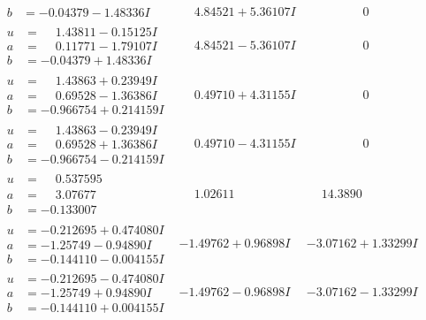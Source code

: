 \documentclass[1p]{elsarticle_modified}
\theoremstyle{definition}
\begin{document}
$$\begin{array}{c|c|c}
\begin{aligned}
b &= -0.04379 - 1.48336 I\end{aligned}
 & \phantom{-}4.84521 + 5.36107 I & \phantom{-0.000000 } 0 \\ \hline\begin{aligned}
u &= \phantom{-}1.43811 - 0.15125 I \\
a &= \phantom{-}0.11771 - 1.79107 I \\
b &= -0.04379 + 1.48336 I\end{aligned}
 & \phantom{-}4.84521 - 5.36107 I & \phantom{-0.000000 } 0 \\ \hline\begin{aligned}
u &= \phantom{-}1.43863 + 0.23949 I \\
a &= \phantom{-}0.69528 - 1.36386 I \\
b &= -0.966754 + 0.214159 I\end{aligned}
 & \phantom{-}0.49710 + 4.31155 I & \phantom{-0.000000 } 0 \\ \hline\begin{aligned}
u &= \phantom{-}1.43863 - 0.23949 I \\
a &= \phantom{-}0.69528 + 1.36386 I \\
b &= -0.966754 - 0.214159 I\end{aligned}
 & \phantom{-}0.49710 - 4.31155 I & \phantom{-0.000000 } 0 \\ \hline\begin{aligned}
u &= \phantom{-}0.537595\phantom{ +0.000000I} \\
a &= \phantom{-}3.07677\phantom{ +0.000000I} \\
b &= -0.133007\phantom{ +0.000000I}\end{aligned}
 & \phantom{-}1.02611\phantom{ +0.000000I} & \phantom{-}14.3890\phantom{ +0.000000I} \\ \hline\begin{aligned}
u &= -0.212695 + 0.474080 I \\
a &= -1.25749 - 0.94890 I \\
b &= -0.144110 - 0.004155 I\end{aligned}
 & -1.49762 + 0.96898 I & -3.07162 + 1.33299 I \\ \hline\begin{aligned}
u &= -0.212695 - 0.474080 I \\
a &= -1.25749 + 0.94890 I \\
b &= -0.144110 + 0.004155 I\end{aligned}
 & -1.49762 - 0.96898 I & -3.07162 - 1.33299 I \\ \hline\begin{aligned}

\end{aligned}
\end{array}$$
\end{document}
